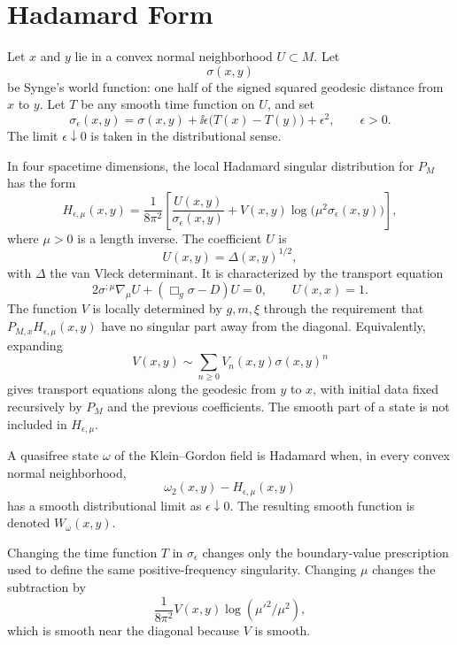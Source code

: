 \section{Hadamard Form}

Let \(x\) and \(y\) lie in a convex normal neighborhood \(U\subset M\).  Let
\[
  \sigma(x,y)
\]
be Synge's world function: one half of the signed squared geodesic distance
from \(x\) to \(y\).  Let \(T\) be any smooth time function on \(U\), and set
\[
  \sigma_\epsilon(x,y)
  =
  \sigma(x,y)+\ii\epsilon\bigl(T(x)-T(y)\bigr)+\epsilon^2,
  \qquad \epsilon>0 .
\]
The limit \(\epsilon\downarrow0\) is taken in the distributional sense.

In four spacetime dimensions, the local Hadamard singular distribution for
\(P_M\) has the form
\begin{equation}
  H_{\epsilon,\mu}(x,y)
  =
  \frac{1}{8\pi^2}
  \left[
    \frac{U(x,y)}{\sigma_\epsilon(x,y)}
    +V(x,y)\log\!\bigl(\mu^2\sigma_\epsilon(x,y)\bigr)
  \right],
  \label{eq:hadamard-parametrix-local}
\end{equation}
where \(\mu>0\) is a length inverse.  The coefficient \(U\) is
\[
  U(x,y)=\Delta(x,y)^{1/2},
\]
with \(\Delta\) the van Vleck determinant.  It is characterized by the
transport equation
\[
  2\sigma^{;\mu}\nabla_\mu U
  +
  (\Box_g\sigma-D)U=0,
  \qquad
  U(x,x)=1 .
\]
The function \(V\) is locally determined by \(g,m,\xi\) through the
requirement that \(P_{M,x}H_{\epsilon,\mu}(x,y)\) have no singular part away
from the diagonal.  Equivalently, expanding
\[
  V(x,y)\sim\sum_{n\ge0}V_n(x,y)\sigma(x,y)^n
\]
gives transport equations along the geodesic from \(y\) to \(x\), with
initial data fixed recursively by \(P_M\) and the previous coefficients.
The smooth part of a state is not included in \(H_{\epsilon,\mu}\).

\begin{definition}
\label{def:hadamard-quasifree-state}
A quasifree state \(\omega\) of the Klein--Gordon field is Hadamard when, in
every convex normal neighborhood,
\[
  \omega_2(x,y)-H_{\epsilon,\mu}(x,y)
\]
has a smooth distributional limit as \(\epsilon\downarrow0\).  The resulting
smooth function is denoted \(W_\omega(x,y)\).
\end{definition}

Changing the time function \(T\) in \(\sigma_\epsilon\) changes only the
boundary-value prescription used to define the same positive-frequency
singularity.  Changing \(\mu\) changes the subtraction by
\[
  \frac{1}{8\pi^2}V(x,y)\log(\mu'^2/\mu^2),
\]
which is smooth near the diagonal because \(V\) is smooth.

